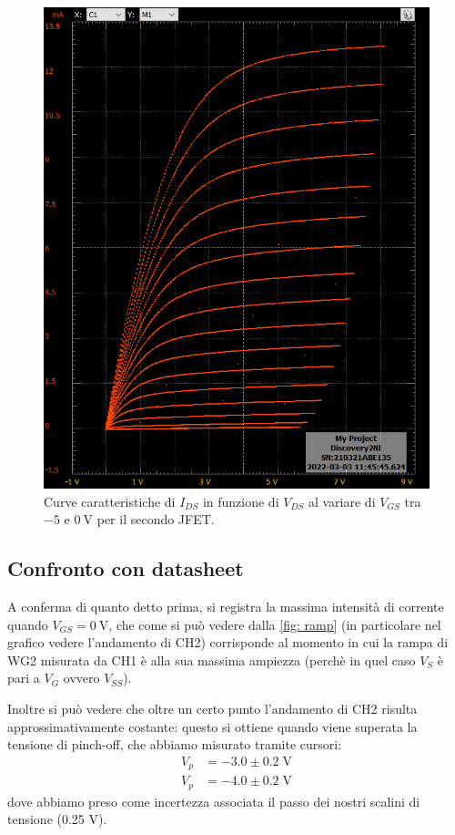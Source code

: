 \documentclass[10pt, a4paper, italian]{article}
\begin{document}
\begin{figure}[htbp]
    \centering
	\includegraphics[scale=0.6]{vgs}
    \caption{Curve caratteristiche di $I_{DS}$ in funzione di $V_{DS}$
    al variare di $V_{GS}$ tra $-5$ e $\SI{0}{\V}$ per il secondo JFET.
    \label{fig: IDS-VDS2}}
\end{figure}

\subsection{Confronto con datasheet}
A conferma di quanto detto prima, si registra la massima intensità di corrente
quando $V_{GS} = \SI{0}{\V}$, che come si può vedere dalla \cref{fig: ramp}
(in particolare nel grafico vedere l'andamento di CH2)
corrisponde al momento in cui la rampa di WG2 misurata da CH1 è alla sua
massima ampiezza (perchè in quel caso $V_S$ è pari a $V_G$ ovvero $V_{SS}$).

Inoltre si può vedere che oltre un certo punto l'andamento di CH2 risulta
approssimativamente costante: questo si ottiene quando viene superata la
tensione di pinch-off, che abbiamo misurato tramite cursori:
\begin{align*}
V_p &= -3.0 \pm 0.2 \; \si{\V} \\
V_p &= -4.0 \pm 0.2 \; \si{\V}
\end{align*}
dove abbiamo preso come incertezza associata il passo dei nostri scalini di
tensione (0.25 V).
\end{document}
